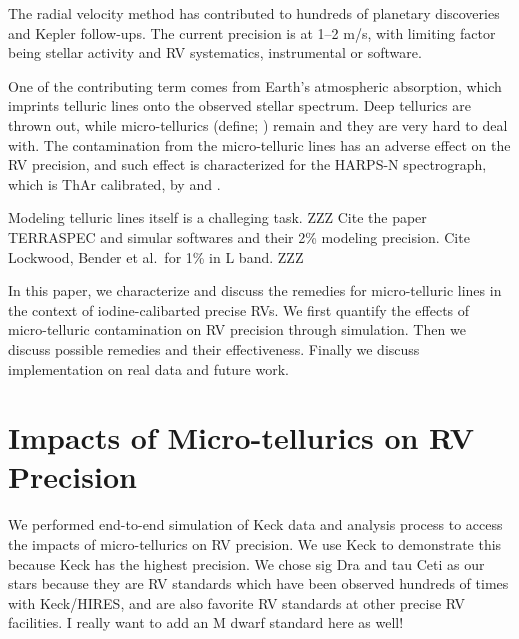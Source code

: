\documentclass{emulateapj}
\begin{document}
\begin{CJK*}{UTF8}{gbsn}
The radial velocity method has contributed to hundreds of planetary
discoveries and Kepler follow-ups. The current precision is at 1--2
m/s, with limiting factor being stellar activity and RV systematics,
instrumental or software.

One of the contributing term comes from Earth's atmospheric
absorption, which imprints telluric lines onto the observed stellar
spectrum. Deep tellurics are thrown out, while micro-tellurics
(define; \citealt{hitran2013}) remain and they are very hard to deal
with. The contamination from the micro-telluric lines has an adverse
effect on the RV precision, and such effect is characterized for the
HARPS-N spectrograph, which is ThAr calibrated, by \cite{artigau2014}
and \cite{cunha2014}.

Modeling telluric lines itself is a challeging task. ZZZ Cite the
paper TERRASPEC and simular softwares and their 2\% modeling
precision. Cite Lockwood, Bender et al.\ for 1\% in L band. ZZZ

In this paper, we characterize and discuss the remedies for
micro-telluric lines in the context of iodine-calibarted precise
RVs. We first quantify the effects of micro-telluric contamination on
RV precision through simulation. Then we discuss possible remedies and
their effectiveness. Finally we discuss implementation on real data
and future work.

\begin{comment}
Jason's suggestions:
- run tau Ceti as target #2
- don't show our classic before+after+difference RV vs. BC, just show
the difference, especially the talk
- show actual data for sig Dra RV vs. BC of Keck, to show that this is
real, it should be standard to plot RV vs. BC to check systematics
(i.e. tellurics)
- Mention Vogt APF paper sig Dra planet.
\end{comment}


\section{Impacts of Micro-tellurics on RV Precision}\label{sec:method}

We performed end-to-end simulation of Keck data and analysis process
to access the impacts of micro-tellurics on RV precision. We use Keck
to demonstrate this because Keck has the highest precision. We chose
sig Dra and tau Ceti as our stars because they are RV standards which
have been observed hundreds of times with Keck/HIRES, and are also
favorite RV standards at other precise RV facilities. I really want to
add an M dwarf standard here as well!



\end{CJK*}
\end{document}
